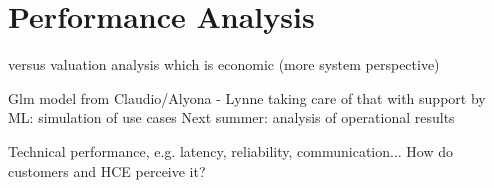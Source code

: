 \chapter{Performance Analysis}

versus valuation analysis which is economic (more system perspective)

Glm model from Claudio/Alyona - Lynne taking care of that with support by ML: simulation of use cases
Next summer: analysis of operational results

Technical performance, e.g. latency, reliability, communication...
How do customers and HCE perceive it?
 

